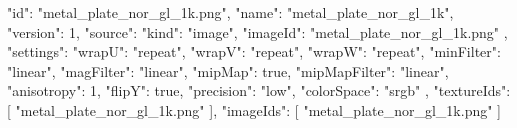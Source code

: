 {
  "id": "metal_plate_nor_gl_1k.png",
  "name": "metal_plate_nor_gl_1k",
  "version": 1,
  "source": {
    "kind": "image",
    "imageId": "metal_plate_nor_gl_1k.png"
  },
  "settings": {
    "wrapU": "repeat",
    "wrapV": "repeat",
    "wrapW": "repeat",
    "minFilter": "linear",
    "magFilter": "linear",
    "mipMap": true,
    "mipMapFilter": "linear",
    "anisotropy": 1,
    "flipY": true,
    "precision": "low",
    "colorSpace": "srgb"
  },
  "textureIds": [
    "metal_plate_nor_gl_1k.png"
  ],
  "imageIds": [
    "metal_plate_nor_gl_1k.png"
  ]
}
